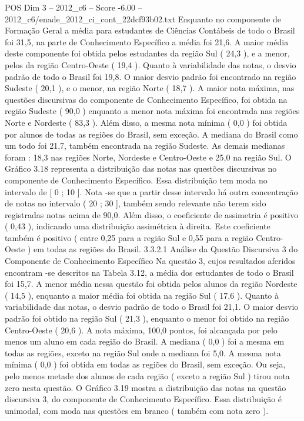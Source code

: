 \begin{textsample}{POS Dim 3 – 2012\_c6 – Score -6.00 – 2012\_c6/enade\_2012\_ci\_cont\_22dcf93b02.txt}
Enquanto no componente de Formação Geral a média para estudantes de Ciências Contábeis de todo o Brasil foi 31,5, na parte de Conhecimento Específico a média foi 21,6.
A maior média deste componente foi obtida pelos estudantes da região Sul ( 24,3 ), e a menor, pelos da região Centro-Oeste ( 19,4 ).
Quanto à variabilidade das notas, o desvio padrão de todo o Brasil foi 19,8.
O maior desvio padrão foi encontrado na região Sudeste ( 20,1 ), e o menor, na região Norte ( 18,7 ).
A maior nota máxima, nas questões discursivas do componente de Conhecimento Específico, foi obtida na região Sudeste ( 90,0 ) enquanto a menor nota máxima foi encontrada nas regiões Norte e Nordeste ( 83,3 ).
Além disso, a mesma nota mínima ( 0,0 ) foi obtida por alunos de todas as regiões do Brasil, sem exceção.
A mediana do Brasil como um todo foi 21,7, também encontrada na região Sudeste.
As demais medianas foram : 18,3 nas regiões Norte, Nordeste e Centro-Oeste e 25,0 na região Sul.
O Gráfico 3.18 representa a distribuição das notas nas questões discursivas no componente de Conhecimento Específico.
Essa distribuição tem moda no intervalo de [ 0 ; 10 ].
Nota -se que a partir desse intervalo há outra concentração de notas no intervalo ( 20 ; 30 ], também sendo relevante não terem sido registradas notas acima de 90,0.
Além disso, o coeficiente de assimetria é positivo ( 0,43 ), indicando uma distribuição assimétrica à direita.
Este coeficiente também é positivo ( entre 0,25 para a região Sul e 0,55 para a região Centro-Oeste ) em todas as regiões do Brasil. 3.3.2.1 Análise da Questão Discursiva 3 do Componente de Conhecimento Específico Na questão 3, cujos resultados aferidos encontram -se descritos na Tabela 3.12, a média dos estudantes de todo o Brasil foi 15,7.
A menor média nessa questão foi obtida pelos alunos da região Nordeste ( 14,5 ), enquanto a maior média foi obtida na região Sul ( 17,6 ).
Quanto à variabilidade das notas, o desvio padrão de todo o Brasil foi 21,1.
O maior desvio padrão foi obtido na região Sul ( 21,3 ), enquanto o menor foi obtido na região Centro-Oeste ( 20,6 ).
A nota máxima, 100,0 pontos, foi alcançada por pelo menos um aluno em cada região do Brasil.
A mediana ( 0,0 ) foi a mesma em todas as regiões, exceto na região Sul onde a mediana foi 5,0.
A mesma nota mínima ( 0,0 ) foi obtida em todas as regiões do Brasil, sem exceção.
Ou seja, pelo menos metade dos alunos de cada região ( exceto a região Sul ) tirou nota zero nesta questão.
O Gráfico 3.19 mostra a distribuição das notas na questão discursiva 3, do componente de Conhecimento Específico.
Essa distribuição é unimodal, com moda nas questões em branco ( também com nota zero ).

\end{textsample}
